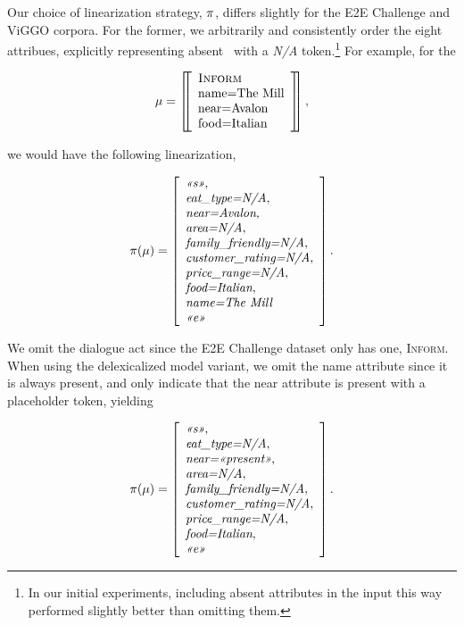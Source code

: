 Our choice of linearization strategy, $\pi$, differs slightly for the E2E
Challenge and ViGGO corpora. For the former, we arbitrarily and consistently
order the eight attribues, explicitly representing absent \attributevalues~with
a \textit{N/A} token.\footnote{In our initial experiments, including absent
attributes in the input this way performed slightly better than omitting them.}
For example, for the \meaningrepresentation
\begin{singlespace}
    \[\mu = \left[\!\!\left[ \begin{array}{l}
    \textsc{Inform}\\
    {\textrm{name=The Mill}}\\
    {\textrm{near=Avalon}}\\
    {\textrm{food=Italian}}  \end{array} \right]\!\!\right],\]
\end{singlespace}
\noindent we would have the following linearization,\begin{singlespace}
\[ \pi(\mu) = \left[\begin{array}{l} \textit{<<s>>},\\ \textit{eat\_type=N/A},\\ \textit{near=Avalon},\\ \textit{area=N/A}, \\ \textit{family\_friendly=N/A},\\ \textit{customer\_rating=N/A}, \\\textit{price\_range=N/A},\\ \textit{food=Italian},\\ \textit{name=The Mill}\\ \textit{<<e>>} \end{array}\right].\] \end{singlespace}
\noindent We omit the dialogue act since the E2E Challenge dataset only has one, \textsc{Inform}. When
    using the delexicalized model variant, we omit the name attribute since
    it is always present, and only indicate that the near attribute is present
    with a placeholder
    token, yielding \begin{singlespace}
\[ \pi(\mu) = \left[\begin{array}{l} \textit{<<s>>},\\ \textit{eat\_type=N/A},\\ \textit{near=<<present>>},\\ \textit{area=N/A}, \\ \textit{family\_friendly=N/A},\\ \textit{customer\_rating=N/A}, \\\textit{price\_range=N/A},\\ \textit{food=Italian},\\ \textit{<<e>>} \end{array}\right].\] \end{singlespace}

